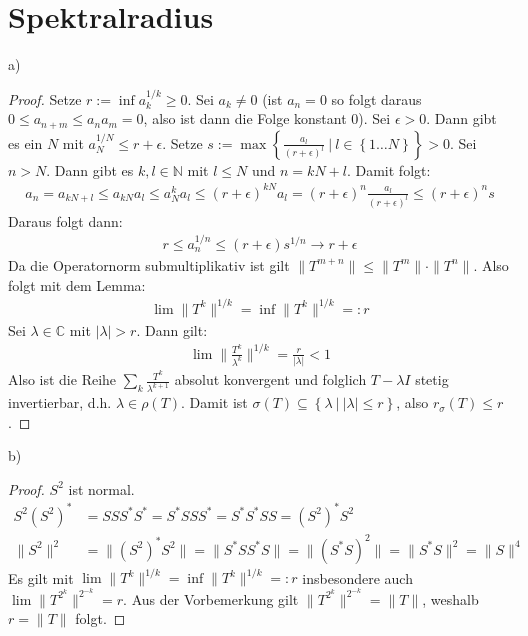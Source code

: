 \documentclass[a4paper,12pt]{article}
\newcommand{\klammer}{}
\begin{document}
\section{Spektralradius}
a)
\begin{proof}
Setze $r:=\inf a_k^{1/k}\ge 0$. Sei $a_k\neq 0$ (ist $a_n=0$ so folgt daraus $0\le a_{n+m}\le a_na_m=0$, also ist dann die Folge konstant $0$). Sei $\epsilon>0$. Dann gibt es ein $N$ mit $a_N^{1/N}\le r+\epsilon$. Setze $s:=\max\klammer\left\{ {\frac{a_l}{(r+\epsilon)^l}\ \vert\ l\in\klammer\left\{ {1\dots N} \right\}} \right\}>0$. Sei $n>N$. Dann gibt es $k,l\in\mathbb{N}$ mit $l\le N$ und $n=kN+l$. Damit folgt:
\begin{align*}
a_n=a_{kN+l}\le a_{kN}a_l\le a_N^ka_l\le (r+\epsilon)^{kN}a_l=(r+\epsilon)^n\frac{a_l}{(r+\epsilon)^l}\le (r+\epsilon)^ns
\end{align*}
Daraus folgt dann:
\begin{align*}
r\le a_n^{1/n}\le (r+\epsilon)s^{1/n}\rightarrow r+\epsilon
\end{align*}
Da die Operatornorm submultiplikativ ist gilt $\|T^{m+n}\|\le\|T^m\|\cdot\|T^n\|$. Also folgt mit dem Lemma:
\begin{align*}
\lim \|T^k\|^{1/k}=\inf\|T^k\|^{1/k}=:r
\end{align*}
Sei $\lambda\in\mathbb{C}$ mit $|\lambda|>r$. Dann gilt:
\begin{align*}
\lim \|\frac{T^k}{\lambda^k}\|^{1/k}=\frac{r}{|\lambda|}<1
\end{align*}
Also ist die Reihe $\sum_k \frac{T^k}{\lambda^{k+1}}$ absolut konvergent und folglich $T-\lambda I$ stetig invertierbar, d.h. $\lambda\in\rho(T)$. Damit ist $\sigma(T)\subseteq\klammer\left\{ {\lambda\ \vert\ |\lambda|\le r} \right\}$, also $r_\sigma(T)\le r$.
\end{proof}
b)
\begin{proof}
$S^2$ ist normal.
\begin{align*}
S^2(S^2)^\ast&=SSS^\ast S^\ast=S^\ast SSS^\ast=S^\ast S^\ast SS=(S^2)^\ast S^2 \\
\|S^2\|^2&=\|(S^2)^\ast S^2\|=\|S^\ast SS^\ast S\|=\|(S^\ast S)^2\|=\|S^\ast S\|^2=\|S\|^4
\end{align*}
Es gilt mit $\lim \|T^k\|^{1/k}=\inf \|T^k\|^{1/k}=:r$ insbesondere auch $\lim \|T^{2^k}\|^{2^{-k}}=r$. Aus der Vorbemerkung gilt $\|T^{2^k}\|^{2^{-k}}=\|T\|$, weshalb $r=\|T\|$ folgt. 
\end{proof}
\end{document}
